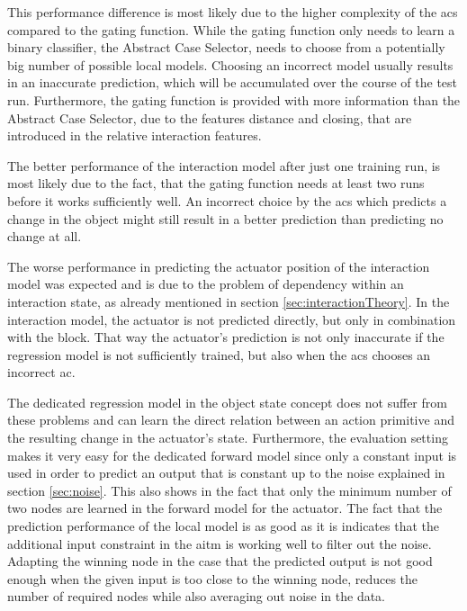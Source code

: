 This performance difference is most likely due to the higher complexity of the \acrfull{acs} compared to the gating function. While the gating function only needs to learn a binary classifier, the Abstract Case Selector, needs to choose from a potentially big number of possible local models. Choosing an incorrect model usually results in an inaccurate prediction, which will be accumulated over the course of the test run. Furthermore, the gating function is provided with more information than the Abstract Case Selector, due to the features distance and closing, that are introduced in the relative interaction features. 

The better performance of the interaction model after just one training run, is most likely due to the fact, that the gating function needs at least two runs before it works sufficiently well. An incorrect choice by the \gls{acs} which predicts a change in the object might still result in a better prediction than predicting no change at all. 

The worse performance in predicting the actuator position of the interaction model was expected and is due to the problem of dependency within an interaction state, as already mentioned in section \ref{sec:interactionTheory}. In the interaction model, the actuator is not predicted directly, but only in combination with the block. That way the actuator's prediction is not only inaccurate if the regression model is not sufficiently trained, but also when the \gls{acs} chooses an incorrect \gls{ac}. 

The dedicated regression model in the object state concept does not suffer from these problems and can learn the direct relation between an action primitive and the resulting change in the actuator's state. Furthermore, the evaluation setting makes it very easy for the dedicated forward model since only a constant input is used in order to predict an output that is constant up to the noise explained in section \ref{sec:noise}. This also shows in the fact that only the minimum number of two nodes are learned in the forward model for the actuator. The fact that the prediction performance of the local model is as good as it is indicates that the additional input constraint in the \gls{aitm} is working well to filter out the noise. Adapting the winning node in the case that the predicted output is not good enough when the given input is too close to the winning node, reduces the number of required nodes while also averaging out noise in the data.


